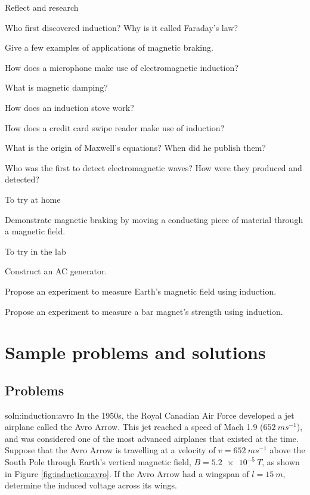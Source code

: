 \begin{chapteractivity}{Reflect and research}
{
\item Who first discovered induction? Why is it called Faraday's law?
\item Give a few examples of applications of magnetic braking.
\item How does a microphone make use of electromagnetic induction?
\item What is magnetic damping?
\item How does an induction stove work?
\item How does a credit card swipe reader make use of induction?
\item What is the origin of Maxwell's equations? When did he publish them?
\item Who was the first to detect electromagnetic waves? How were they produced and detected?
}
\end{chapteractivity}
\begin{chapteractivity}{To try at home}
{
\item Demonstrate magnetic braking by moving a conducting piece of material through a magnetic field.
}
\end{chapteractivity}
\begin{chapteractivity}{To try in the lab}
{
\item Construct an AC generator.
\item Propose an experiment to measure Earth's magnetic field using induction.
\item Propose an experiment to measure a bar magnet's strength using induction.
}
\end{chapteractivity}

\newpage
\section{Sample problems and solutions}
\subsection{Problems}
\begin{problem}{soln:induction:avro}{\label{prob:induction:avro} 
In the 1950s, the Royal Canadian Air Force developed a jet airplane called the Avro Arrow. This jet reached a speed of Mach 1.9 ($\SI{652}{ms^{-1}}$), and was considered one of the most advanced airplanes that existed at the time. Suppose that the Avro Arrow is travelling at a velocity of $v = \SI{652}{ms^{-1}}$ above the South Pole through Earth's vertical magnetic field, $B = \SI{5.2e-5}{T}$, as shown in Figure \ref{fig:induction:avro}. If the Avro Arrow had a wingspan of $l = \SI{15}{m}$, determine the induced voltage across its wings.
}
\end{problem}


